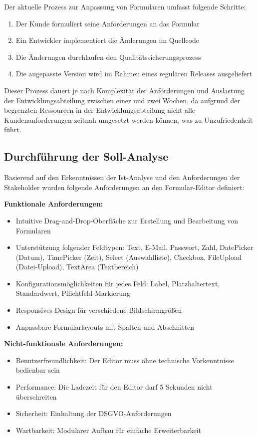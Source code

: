 \documentclass[a4paper,11pt]{article}
\begin{document}
Der aktuelle Prozess zur Anpassung von Formularen umfasst folgende Schritte:
\begin{enumerate}
  \item Der Kunde formuliert seine Anforderungen an das Formular
  \item Ein Entwickler implementiert die Änderungen im Quellcode
  \item Die Änderungen durchlaufen den Qualitätssicherungsprozess
  \item Die angepasste Version wird im Rahmen eines regulären Releases ausgeliefert
\end{enumerate}

\noindent Dieser Prozess dauert je nach Komplexität der Anforderungen und Auslastung der Entwicklungsabteilung zwischen einer und zwei Wochen, da aufgrund der begrenzten Ressourcen in der Entwicklungsabteilung nicht alle Kundenanforderungen zeitnah umgesetzt werden können, was zu Unzufriedenheit führt.

\subsection{Durchführung der Soll-Analyse}
Basierend auf den Erkenntnissen der Ist-Analyse und den Anforderungen der Stakeholder wurden folgende Anforderungen an den Formular-Editor definiert:

\textbf{Funktionale Anforderungen:}
\begin{itemize}
  \item Intuitive Drag-and-Drop-Oberfläche zur Erstellung und Bearbeitung von Formularen
  \item Unterstützung folgender Feldtypen: Text, E-Mail, Passwort, Zahl, DatePicker (Datum), TimePicker (Zeit), Select (Auswahlliste), Checkbox, FileUpload (Datei-Upload), TextArea (Textbereich)
  \item Konfigurationsmöglichkeiten für jedes Feld: Label, Platzhaltertext, Standardwert, Pflichtfeld-Markierung
  \item Responsives Design für verschiedene Bildschirmgrößen
  \item Anpassbare Formularlayouts mit Spalten und Abschnitten
\end{itemize}

\textbf{Nicht-funktionale Anforderungen:}
\begin{itemize}
  \item Benutzerfreundlichkeit: Der Editor muss ohne technische Vorkenntnisse bedienbar sein
  \item Performance: Die Ladezeit für den Editor darf 5 Sekunden nicht überschreiten
  \item Sicherheit: Einhaltung der DSGVO-Anforderungen
  \item Wartbarkeit: Modularer Aufbau für einfache Erweiterbarkeit
\end{itemize}
\end{document}
